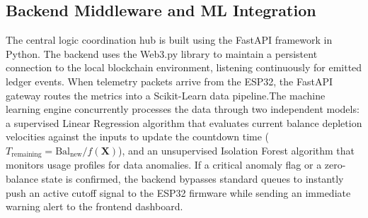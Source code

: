 \subsection{Backend Middleware and ML Integration}
The central logic coordination hub is built using the FastAPI framework in Python. The backend uses the Web3.py library to maintain a persistent connection to the local blockchain environment, listening continuously for emitted ledger events. When telemetry packets arrive from the ESP32, the FastAPI gateway routes the metrics into a Scikit-Learn data pipeline.The machine learning engine concurrently processes the data through two independent models: a supervised Linear Regression algorithm that evaluates current balance depletion velocities against the inputs to update the countdown time ($T_{\text{remaining}} = \text{Bal}_{\text{new}} / f(\mathbf{X})$), and an unsupervised Isolation Forest algorithm that monitors usage profiles for data anomalies. If a critical anomaly flag or a zero-balance state is confirmed, the backend bypasses standard queues to instantly push an active cutoff signal to the ESP32 firmware while sending an immediate warning alert to the frontend dashboard.

